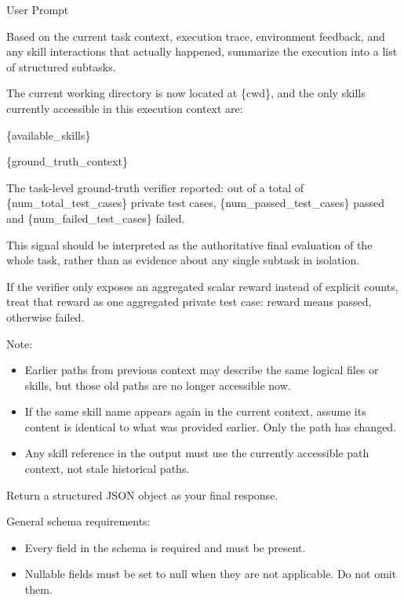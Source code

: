 \documentclass{llmxive}
\providecommand{\svpromptheading}[1]{\par\smallskip\noindent{\sffamily\bfseries#1}\par}
\providecommand{\svinlinecode}[1]{{\ttfamily #1}}
\begin{document}
\begin{svpromptbox}{User Prompt}

\svpromptheading{TODO}
\smallskip
Based on the current task context, execution trace, environment feedback, and any skill interactions that actually happened, summarize the execution into a list of structured subtasks.\par
\smallskip
\svpromptheading{Input}
\smallskip
The current working directory is now located at \svinlinecode{\{cwd\}}, and the only skills currently accessible in this execution context are:\par
\svinlinecode{\{available\_skills\}}\par
\smallskip
\{ground\_truth\_context\}\par
\smallskip
The task-level ground-truth verifier reported: out of a total of \{num\_total\_test\_cases\} private test cases, \{num\_passed\_test\_cases\} passed and \{num\_failed\_test\_cases\} failed.\par
\smallskip
This signal should be interpreted as the authoritative final evaluation of the whole task, rather than as evidence about any single subtask in isolation.\par
If the verifier only exposes an aggregated scalar reward instead of explicit counts, treat that reward as one aggregated private test case: reward \svinlinecode{1} means passed, otherwise failed.\par
\smallskip
Note:\par
\smallskip
\begin{itemize}
\item Earlier paths from previous context may describe the same logical files or skills, but those old paths are no longer accessible now.
\item If the same skill name appears again in the current context, assume its content is identical to what was provided earlier. Only the path has changed.
\item Any skill reference in the output must use the currently accessible path context, not stale historical paths.
\end{itemize}
\smallskip
\svpromptheading{Output}
\smallskip
Return a structured JSON object as your final response.\par
\smallskip
General schema requirements:\par
\smallskip
\begin{itemize}
\item Every field in the schema is required and must be present.
\item Nullable fields must be set to \svinlinecode{null} when they are not applicable. Do not omit them.

\end{itemize}
\end{svpromptbox}
\end{document}
